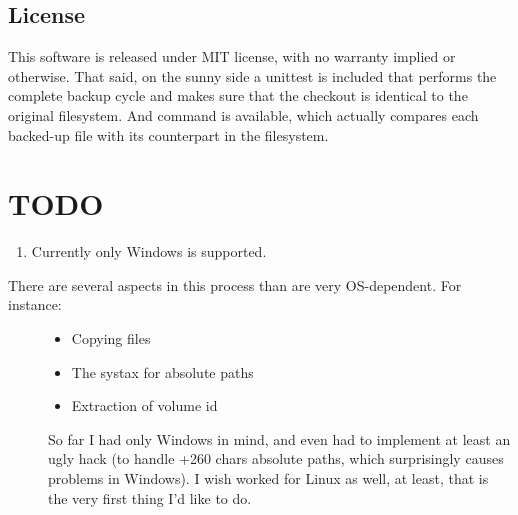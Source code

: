 \documentclass[letterpaper,10pt,english]{sphinxmanual}
\begin{document}
\section{License}
\label{\detokenize{index:license}}
This software is released under MIT license, with no warranty implied or otherwise. That said, on the sunny side a unittest is included that performs the complete backup cycle and
makes sure that the checkout is identical to the original filesystem. And  command is available, which actually compares each backed-up file with its
counterpart in the filesystem.


\chapter{TODO}
\label{\detokenize{index:todo}}\begin{enumerate}
\item {} 
Currently only Windows is supported.

\end{enumerate}
\begin{description}
\item[{There are several aspects in this process than are very OS-dependent. For instance:}] \leavevmode\begin{itemize}
\item {} 
Copying files

\item {} 
The systax for absolute paths

\item {} 
Extraction of volume id

\end{itemize}

So far I had only Windows in mind, and even had to implement at least an ugly hack (to handle +260 chars absolute paths, which
surprisingly causes problems in Windows). I wish  worked for Linux as well, at least, that is the very first thing I'd like to do.

\end{description}
\end{document}
